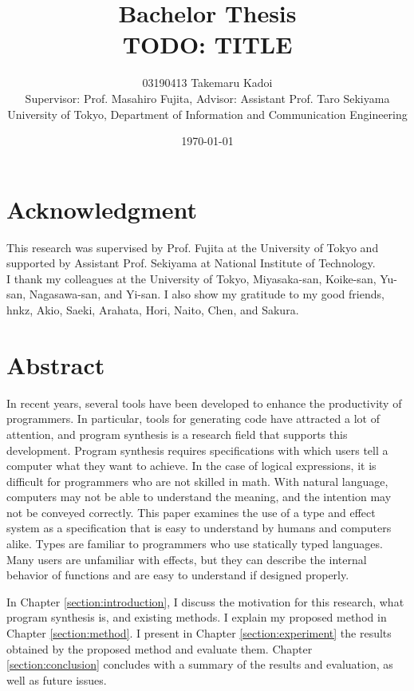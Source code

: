 \documentclass[12pt, a4paper, titlepage]{report}
\title{Bachelor Thesis \\ TODO: TITLE}
\author{
  03190413 Takemaru Kadoi
  \\[1cm]
  {\small Supervisor: Prof. Masahiro Fujita},
  {\small Advisor: Assistant Prof. Taro Sekiyama}
  \\[1cm]
  {\small University of Tokyo, Department of Information and Communication Engineering}
}
\date{\today}
\begin{document}


\maketitle
\newpage
\tableofcontents
\newpage

\chapter*{Acknowledgment}
This research was supervised by Prof. Fujita at the University of Tokyo and supported by Assistant Prof. Sekiyama at National Institute of Technology. \\
I thank my colleagues at the University of Tokyo, Miyasaka-san, Koike-san, Yu-san, Nagasawa-san, and Yi-san.
I also show my gratitude to my good friends, hnkz, Akio, Saeki, Arahata, Hori, Naito, Chen, and Sakura.

\chapter{Abstract} \label{section:abstract}
In recent years, several tools have been developed to enhance the productivity of programmers.
In particular, tools for generating code have attracted a lot of attention, and program synthesis is a research field that supports this development.
Program synthesis requires specifications with which users tell a computer what they want to achieve.
In the case of logical expressions, it is difficult for programmers who are not skilled in math.
With natural language, computers may not be able to understand the meaning, and the intention may not be conveyed correctly.
This paper examines the use of a type and effect system as a specification that is easy to understand by humans and computers alike.
Types are familiar to programmers who use statically typed languages.
Many users are unfamiliar with effects, but they can describe the internal behavior of functions and are easy to understand if designed properly.

In Chapter \ref{section:introduction}, I discuss the motivation for this research, what program synthesis is, and existing methods.
I explain my proposed method in Chapter \ref{section:method}.
I present in Chapter \ref{section:experiment} the results obtained by the proposed method and evaluate them.
Chapter \ref{section:conclusion} concludes with a summary of the results and evaluation, as well as future issues.
\end{document}
